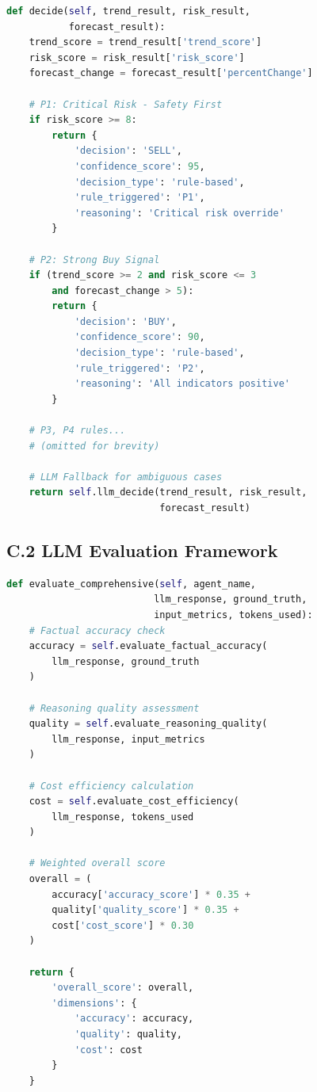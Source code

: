 \documentclass[11pt,letterpaper]{article}
\begin{document}
\begin{lstlisting}[language=Python, caption={Decision Agent Core Logic}]
def decide(self, trend_result, risk_result, 
           forecast_result):
    trend_score = trend_result['trend_score']
    risk_score = risk_result['risk_score']
    forecast_change = forecast_result['percentChange']
    
    # P1: Critical Risk - Safety First
    if risk_score >= 8:
        return {
            'decision': 'SELL',
            'confidence_score': 95,
            'decision_type': 'rule-based',
            'rule_triggered': 'P1',
            'reasoning': 'Critical risk override'
        }
    
    # P2: Strong Buy Signal
    if (trend_score >= 2 and risk_score <= 3 
        and forecast_change > 5):
        return {
            'decision': 'BUY',
            'confidence_score': 90,
            'decision_type': 'rule-based',
            'rule_triggered': 'P2',
            'reasoning': 'All indicators positive'
        }
    
    # P3, P4 rules...
    # (omitted for brevity)
    
    # LLM Fallback for ambiguous cases
    return self.llm_decide(trend_result, risk_result,
                           forecast_result)
\end{lstlisting}

\subsection*{C.2 LLM Evaluation Framework}

\begin{lstlisting}[language=Python, caption={Evaluation Core}]
def evaluate_comprehensive(self, agent_name, 
                          llm_response, ground_truth,
                          input_metrics, tokens_used):
    # Factual accuracy check
    accuracy = self.evaluate_factual_accuracy(
        llm_response, ground_truth
    )
    
    # Reasoning quality assessment
    quality = self.evaluate_reasoning_quality(
        llm_response, input_metrics
    )
    
    # Cost efficiency calculation
    cost = self.evaluate_cost_efficiency(
        llm_response, tokens_used
    )
    
    # Weighted overall score
    overall = (
        accuracy['accuracy_score'] * 0.35 +
        quality['quality_score'] * 0.35 +
        cost['cost_score'] * 0.30
    )
    
    return {
        'overall_score': overall,
        'dimensions': {
            'accuracy': accuracy,
            'quality': quality,
            'cost': cost
        }
    }
\end{lstlisting}
\end{document}
